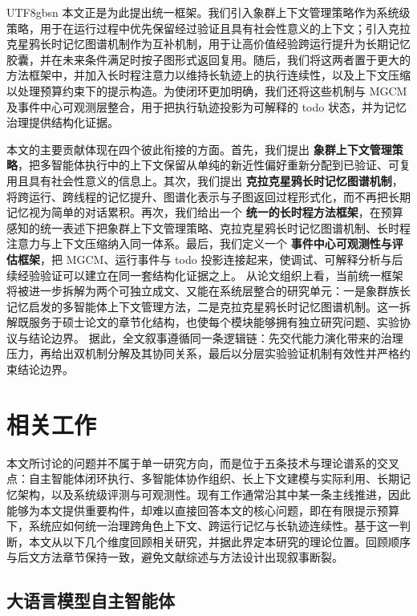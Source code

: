 \documentclass[a4paper,fleqn]{cas-sc}
\begin{document}
\begin{CJK*}{UTF8}{gbsn}
本文正是为此提出统一框架。我们引入象群上下文管理策略作为系统级策略，用于在运行过程中优先保留经过验证且具有社会性意义的上下文；引入克拉克星鸦长时记忆图谱机制作为互补机制，用于让高价值经验跨运行提升为长期记忆胶囊，并在未来条件满足时按子图形式返回复用。随后，我们将这两者置于更大的方法框架中，并加入长时程注意力以维持长轨迹上的执行连续性，以及上下文压缩以处理预算约束下的提示构造。为使闭环更加明确，我们还将这些机制与 MGCM 及事件中心可观测层整合，用于把执行轨迹投影为可解释的 todo 状态，并为记忆治理提供结构化证据。

本文的主要贡献体现在四个彼此衔接的方面。首先，我们提出 \textbf{象群上下文管理策略}，把多智能体执行中的上下文保留从单纯的新近性偏好重新分配到已验证、可复用且具有社会性意义的信息上。其次，我们提出 \textbf{克拉克星鸦长时记忆图谱机制}，将跨运行、跨线程的记忆提升、图谱化表示与子图返回过程形式化，而不再把长期记忆视为简单的对话累积。再次，我们给出一个 \textbf{统一的长时程方法框架}，在预算感知的统一表述下把象群上下文管理策略、克拉克星鸦长时记忆图谱机制、长时程注意力与上下文压缩纳入同一体系。最后，我们定义一个 \textbf{事件中心可观测性与评估框架}，把 MGCM、运行事件与 todo 投影连接起来，使调试、可解释分析与后续经验验证可以建立在同一套结构化证据之上。
从论文组织上看，当前统一框架将被进一步拆解为两个可独立成文、又能在系统层整合的研究单元：一是象群族长记忆启发的多智能体上下文管理方法，二是克拉克星鸦长时记忆图谱机制。这一拆解既服务于硕士论文的章节化结构，也使每个模块能够拥有独立研究问题、实验协议与结论边界。
据此，全文叙事遵循同一条逻辑链：先交代能力演化带来的治理压力，再给出双机制分解及其协同关系，最后以分层实验验证机制有效性并严格约束结论边界。

\section{相关工作}

本文所讨论的问题并不属于单一研究方向，而是位于五条技术与理论谱系的交叉点：自主智能体闭环执行、多智能体协作组织、长上下文建模与实际利用、长期记忆架构，以及系统级评测与可观测性。现有工作通常沿其中某一条主线推进，因此能够为本文提供重要构件，却难以直接回答本文的核心问题，即在有限提示预算下，系统应如何统一治理跨角色上下文、跨运行记忆与长轨迹连续性。基于这一判断，本文从以下几个维度回顾相关研究，并据此界定本研究的理论位置。回顾顺序与后文方法章节保持一致，避免文献综述与方法设计出现叙事断裂。

\subsection{大语言模型自主智能体}


\end{CJK*}
\end{document}
